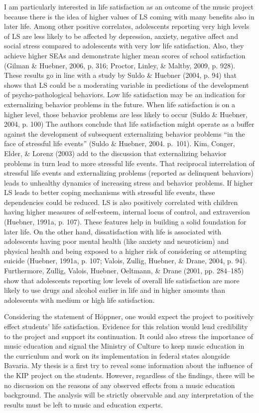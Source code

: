 \documentclass[a4, 12pt]{article}
\begin{document}
I am particularly interested in life satisfaction as an outcome of the music project because there is the idea of higher values of LS coming with many benefits also in later life. Among other positive correlates, adolescents reporting very high levels of LS are less likely to be affected by depression, anxiety, negative affect and social stress compared to adolescents with very low life satisfaction. Also, they achieve higher SEAs and demonstrate higher mean scores of school satisfaction (Gilman \& Huebner, 2006, p. 316; Proctor, Linley, \& Maltby, 2009, p. 928). These results go in line with a study by Suldo \& Huebner (2004, p. 94) that shows that LS could be a moderating variable in predictions of the development of psycho-pathological behaviors. Low life satisfaction may be an indication for externalizing behavior problems in the future. When life satisfaction is on a higher level, those behavior problems are less likely to occur (Suldo \& Huebner, 2004, p. 100) The authors conclude that life satisfaction might operate as a buffer against the development of subsequent externalizing behavior problems ``in the face of stressful life events'' (Suldo \& Huebner, 2004. p.~101). Kim, Conger, Elder, \& Lorenz (2003) add to the discussion that externalizing behavior problems in turn lead to more stressful life events. That reciprocal interrelation of stressful life events and externalizing problems (reported as delinquent behaviors) leads to unhealthy dynamics of increasing stress and behavior problems. If higher LS leads to better coping mechanisms with stressful life events, these dependencies could be reduced.
LS is also positively correlated with children having higher measures of self-esteem, internal locus of control, and extraversion (Huebner, 1991a, p. 107). These features help in building a solid foundation for later life. On the other hand, dissatisfaction with life is associated with adolescents having poor mental health (like anxiety and neuroticism) and physical health and being exposed to a higher risk of considering or attempting suicide (Huebner, 1991a, p. 107; Valois, Zullig, Huebner, \& Drane, 2004, p. 94). Furthermore, Zullig, Valois, Huebner, Oeltmann, \& Drane (2001, pp. 284--185) show that adolescents reporting low levels of overall life satisfaction are more likely to use drugs and alcohol earlier in life and in higher amounts than adolescents with medium or high life satisfaction.

Considering the statement of Höppner, one would expect the project to positively effect students' life satisfaction. Evidence for this relation would lend credibility to the project and support its continuation. It could also stress the importance of music education and signal the Ministry of Culture to keep music education in the curriculum and work on its implementation in federal states alongside Bavaria. My thesis is a first try to reveal some information about the influence of the KIP project on the students. However, regardless of the findings, there will be no discussion on the reasons of any observed effects from a music education background. The analysis will be strictly observable and any interpretation of the results must be left to music and education experts.
\end{document}
